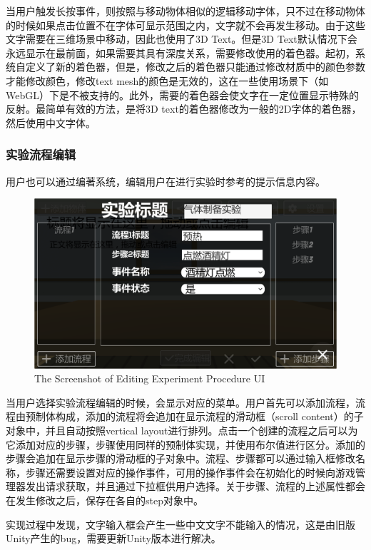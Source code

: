 当用户触发长按事件，则按照与移动物体相似的逻辑移动字体，只不过在移动物体的时候如果点击位置不在字体可显示范围之内，文字就不会再发生移动。由于这些文字需要在三维场景中移动，因此也使用了3D Text。但是3D Text默认情况下会永远显示在最前面，如果需要其具有深度关系，需要修改使用的着色器。起初，系统自定义了新的着色器，但是，修改之后的着色器只能通过修改材质中的颜色参数才能修改颜色，修改text mesh的颜色是无效的，这在一些使用场景下（如WebGL）下是不被支持的。此外，需要的着色器会使文字在一定位置显示特殊的反射。最简单有效的方法，是将3D text的着色器修改为一般的2D字体的着色器，然后使用中文字体。

\subsubsection{实验流程编辑}
用户也可以通过编著系统，编辑用户在进行实验时参考的提示信息内容。

\begin{figure}[!htp]
  \centering
  \includegraphics[width=12cm]{figure/step.png}
    {The Screenshot of Editing Experiment Procedure UI}
 \label{fig:gm}
\end{figure}

当用户选择实验流程编辑的时候，会显示对应的菜单。用户首先可以添加流程，流程由预制体构成，添加的流程将会追加在显示流程的滑动框（scroll content）的子对象中，并且自动按照vertical layout进行排列。点击一个创建的流程之后可以为它添加对应的步骤，步骤使用同样的预制体实现，并使用布尔值进行区分。添加的步骤会追加在显示步骤的滑动框的子对象中。流程、步骤都可以通过输入框修改名称，步骤还需要设置对应的操作事件，可用的操作事件会在初始化的时候向游戏管理器发出请求获取，并且通过下拉框供用户选择。关于步骤、流程的上述属性都会在发生修改之后，保存在各自的step对象中。

实现过程中发现，文字输入框会产生一些中文文字不能输入的情况，这是由旧版Unity产生的bug，需要更新Unity版本进行解决。

